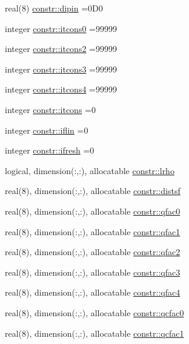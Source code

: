 \begin{DoxyCompactItemize}
real(8) \hyperlink{namespaceconstr_a887fcb22bdc9514af569e050617e5520}{constr\+::dipin} =0\+D0
\item 
integer \hyperlink{namespaceconstr_a3d32b892a876bc95ceb84d5fd4a08d73}{constr\+::itcons0} =99999
\item 
integer \hyperlink{namespaceconstr_a30f4c618301cfa861b28f20f3c5cb81d}{constr\+::itcons2} =99999
\item 
integer \hyperlink{namespaceconstr_a4afb13fcfc904a320758247b7d5b06ea}{constr\+::itcons3} =99999
\item 
integer \hyperlink{namespaceconstr_a863a7bff97cfb37f8ca4b42156a89e84}{constr\+::itcons4} =99999
\item 
integer \hyperlink{namespaceconstr_a1c14adff3a21fe2b7dd3805ca890a711}{constr\+::itcons} =0
\item 
integer \hyperlink{namespaceconstr_ab2fbc57b03ef687dc320a927da5e22a3}{constr\+::iflin} =0
\item 
integer \hyperlink{namespaceconstr_abc7bfde5d5d47ed18ddc164508cfa1ac}{constr\+::ifresh} =0
\item 
logical, dimension(\+:,\+:), allocatable \hyperlink{namespaceconstr_acc27ba959f19761e554a08b943b4a8d2}{constr\+::lrho}
\item 
real(8), dimension(\+:,\+:), allocatable \hyperlink{namespaceconstr_a2aa658d9e448900c74a484233c9c3e65}{constr\+::distsf}
\item 
real(8), dimension(\+:,\+:), allocatable \hyperlink{namespaceconstr_abe00dd6a7a2fb5c37a87dd62dbcfa67a}{constr\+::qfac0}
\item 
real(8), dimension(\+:,\+:), allocatable \hyperlink{namespaceconstr_a53efe856c63b5d63637c1aa813a3a205}{constr\+::qfac1}
\item 
real(8), dimension(\+:,\+:), allocatable \hyperlink{namespaceconstr_a07ecd53eb439059f24f9da31a9261e37}{constr\+::qfac2}
\item 
real(8), dimension(\+:,\+:), allocatable \hyperlink{namespaceconstr_a6ce54a1e7305b2e04c8db7e4e0b462db}{constr\+::qfac3}
\item 
real(8), dimension(\+:,\+:), allocatable \hyperlink{namespaceconstr_a362515a302fb05cad337f01df7b447e1}{constr\+::qfac4}
\item 
real(8), dimension(\+:,\+:), allocatable \hyperlink{namespaceconstr_a6b2a3c58bac912d4a73157efe7676b4c}{constr\+::qcfac0}
\item 
real(8), dimension(\+:,\+:), allocatable \hyperlink{namespaceconstr_a7e953ba3a87c37edea28ada189132d1b}{constr\+::qcfac1}
\item 

\end{DoxyCompactItemize}

